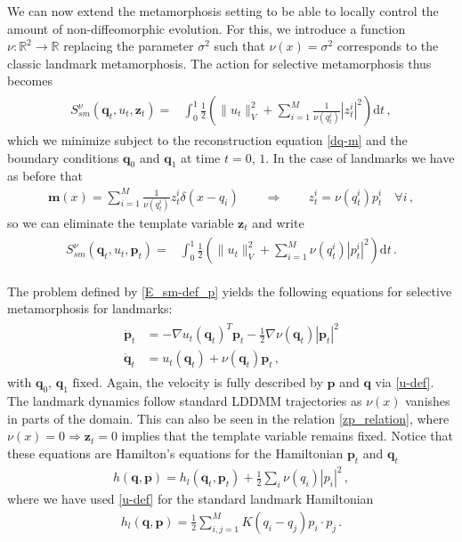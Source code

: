 \documentclass[runningheads]{llncs}
\newcommand{\half}{\frac 12}
\newcommand{\norm}[2]{\| #1 \|_{ #2 }}
\newcommand{\vnorm}[1]{\norm{ #1 }{V}}
\newcommand{\diff}[1]{\text{d} #1}
\begin{document}
We can now extend the metamorphosis setting to be able to locally control the
amount of non-diffeomorphic evolution.  For this, we introduce a function $\nu:
\mathbb R^2\to \mathbb R$ replacing the parameter $\sigma^2$ such that
$\nu(x)=\sigma^2$ corresponds to the classic landmark metamorphosis. The action 
for selective metamorphosis thus becomes 
\begin{align}
  \begin{split}
    S_{sm}^\nu(\mathbf q_t, u_t, \mathbf z_t) = & \int_0^1
    \half  \left (\vnorm{u_t}^2 +\sum_{i=1}^M \frac{1}{\nu(q_t^i)}|z_t^i|^2\right )\diff{t}\, , 
  \end{split}
  \label{E_sm-def}
\end{align}
which we minimize subject to the reconstruction equation \eqref{dq-m} and the
boundary conditions $\mathbf q_0$ and $\mathbf q_1$ at time $t=0,\,1$. In the
case of landmarks we have as before that
\begin{align}\label{zp_relation}
  \mathbf m(x) = \sum_{i=1}^M \frac{1}{\nu(q_t^i)} z_t^i\delta(x-q_i)\qquad \Rightarrow \qquad
  z_t^i = \nu(q_t^i) p_t^i\quad \forall i\, , 
\end{align}
so we can eliminate the template variable $\mathbf z_t$ and write  
\begin{align}
  \begin{split}
    S_{sm}^\nu(\mathbf q_t, u_t, \mathbf p_t) = & \int_0^1
    \half  \left (\|u_t\|_V^2  +\sum_{i=1}^M \nu(q_t^i)|p_t^i|^2\right )\diff{t}\, . 
  \end{split}
  \label{E_sm-def_p}
\end{align}

The problem defined by \eqref{E_sm-def_p} yields the following equations for
selective metamorphosis for landmarks:
\begin{align}
  \begin{split}
  \dot{\mathbf p}_t &= - \nabla u_t(\mathbf q_t)^T \mathbf p_t - \frac12
  \nabla \nu(\mathbf q_t ) |\mathbf p_t|^2\\ \dot{\mathbf q}_t &= u_t(\mathbf q_t) +
  \nu(\mathbf q_t)\mathbf p_t \,,
\end{split}
  \label{eq-m-selective}
\end{align}
with $\mathbf q_0,\, \mathbf q_1 \text{ fixed}$. Again, the velocity is fully
described by $\mathbf p$ and $\mathbf q$ via \eqref{u-def}. The landmark
dynamics follow standard LDDMM trajectories as $\nu(x)$ vanishes in parts of the
domain.  This can also be seen in the relation \eqref{zp_relation}, where
$\nu(x)=0 \Rightarrow \mathbf z_t=0$ implies that the template variable remains
fixed. Notice that these equations are Hamilton's equations for the Hamiltonian
$\mathbf p_t$ and $\mathbf q_t$
\begin{align}
  h(\mathbf q, \mathbf p) = h_l(\mathbf q_t,\mathbf p_t)+\frac12\sum_i\nu(q_i) |p_i|^2\,,  
\end{align}
where we have used \eqref{u-def} for the standard landmark Hamiltonian
\begin{align}
  h_l(\mathbf q, \mathbf p) =  \frac12 \sum_{i,j=1}^M K(q_i-q_j)p_i\cdot p_j\, . 
\label{hamiltonian}
\end{align}
\end{document}
